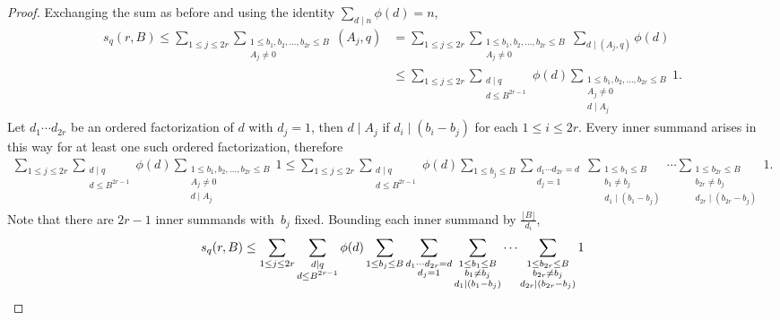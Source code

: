 \documentclass[12pt]{amsart}
\theoremstyle{plain}
\theoremstyle{definition}
\begin{document}
\begin{proof}
Exchanging the sum as before and using the identity $\sum_{d\mid n} \phi(d) = n$,
\begin{align*}
s_q(r, B) \le \sum_{1\le j\le 2r} \mathop{\sum\nolimits}\limits_{\substack{1\le b_1,b_2,\dots,b_{2r}\le B \\ A_j\ne0}} (A_j,q) &= \sum_{1\le j\le 2r} \mathop{\sum\nolimits}\limits_{\substack{1\le b_1,b_2,\dots,b_{2r}\le B \\ A_j\ne0}} \sum_{d\mid (A_j,q)} \phi(d) \\
&\le \sum_{1\le j\le 2r} \sum_{\substack{d\mid q \\ d\le B^{2r-1}}} \phi(d) \sum_{\substack{1\le b_1,b_2,\dots,b_{2r}\le B \\ A_j\ne0 \\ d\mid A_j}} 1.
\end{align*}
Let $d_1\cdots d_{2r}$ be an ordered factorization of $d$ with $d_j=1$, then $d\mid A_j$ if $d_i\mid(b_i-b_j)$ for each $1\le i\le 2r$. Every inner summand arises in this way for at least one such ordered factorization, therefore
\begin{align*}
\sum_{1\le j\le 2r} \sum_{\substack{d\mid q \\ d\le B^{2r-1}}} \phi(d) \sum_{\substack{1\le b_1,b_2,\dots,b_{2r}\le B \\ A_j\ne0 \\ d\mid A_j}} 1 \le \sum_{1\le j\le 2r} \sum_{\substack{d\mid q \\ d\le B^{2r-1}}} \phi(d) \sum_{1\le b_j\le B} \sum_{\substack{d_1\cdots d_{2r}=d \\ d_j=1}} \sum_{\substack{1\le b_1\le B \\ b_1\ne b_j \\ d_1\mid(b_1-b_j)}} \cdots \sum_{\substack{1\le b_{2r}\le B \\ b_{2r}\ne b_j \\ d_{2r}\mid(b_{2r}-b_j)}} 1.
\end{align*}
Note that there are $2r-1$ inner summands with~$b_j$ fixed. Bounding each inner summand by $\displaystyle \frac{\lfloor B\rfloor}{d_i}$,
\begin{align}\notag
\label{eq keep gcd}
s_q(r, B)&\le \sum_{1\le j\le 2r} \sum_{\substack{d\mid q \\ d\le B^{2r-1}}} \phi(d) \sum_{1\le b_j\le B}  \sum_{\substack{d_1\cdots d_{2r}=d \\ d_j=1}} \sum_{\substack{1\le b_1\le B \\ b_1\ne b_j \\ d_1\mid(b_1-b_j)}} \cdots \sum_{\substack{1\le b_{2r}\le B \\ b_{2r}\ne b_j \\ d_{2r}\mid(b_{2r}-b_j)}} 1 \\

\end{align}
\end{proof}
\end{document}
